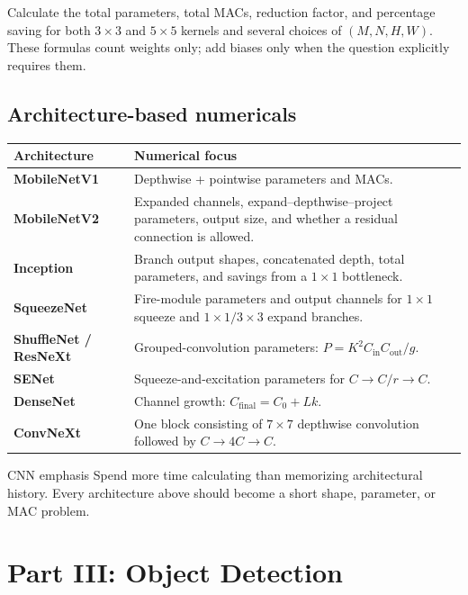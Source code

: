 \documentclass[11pt]{article}
\begin{document}
Calculate the total parameters, total MACs, reduction factor, and percentage saving for both \(3\times3\) and \(5\times5\) kernels and several choices of \((M,N,H,W)\). These formulas count weights only; add biases only when the question explicitly requires them.

\subsection{Architecture-based numericals}

\begin{center}
\small
\begin{tabularx}{\textwidth}{>{\bfseries}p{3.2cm} X}
\toprule
Architecture & Numerical focus \\
\midrule
MobileNetV1 & Depthwise + pointwise parameters and MACs. \\
MobileNetV2 & Expanded channels, expand--depthwise--project parameters, output size, and whether a residual connection is allowed. \\
Inception & Branch output shapes, concatenated depth, total parameters, and savings from a \(1\times1\) bottleneck. \\
SqueezeNet & Fire-module parameters and output channels for \(1\times1\) squeeze and \(1\times1/3\times3\) expand branches. \\
ShuffleNet / ResNeXt & Grouped-convolution parameters: \(P=K^2C_{\mathrm{in}}C_{\mathrm{out}}/g\). \\
SENet & Squeeze-and-excitation parameters for \(C\to C/r\to C\). \\
DenseNet & Channel growth: \(C_{\mathrm{final}}=C_0+Lk\). \\
ConvNeXt & One block consisting of \(7\times7\) depthwise convolution followed by \(C\to4C\to C\). \\
\bottomrule
\end{tabularx}
\end{center}

\begin{prioritybox}{CNN emphasis}
Spend more time calculating than memorizing architectural history. Every architecture above should become a short shape, parameter, or MAC problem.
\end{prioritybox}

\section{Part III: Object Detection}
\end{document}
